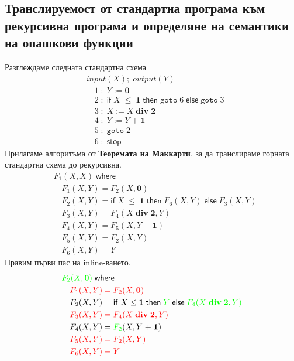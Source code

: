 \documentclass[14pt]{extarticle}
\begin{document}
\subsection*{Транслируемост от стандартна програма към рекурсивна програма и определяне на семантики на опашкови функции}
Разглеждаме следната стандартна схема
\begin{align*}
    & input(X); \; output(Y) \\
    & \quad 1 \; : \; Y := \mathbf 0 \\
    & \quad 2 \; : \; \mathsf{if} \; X \;\mathbf{\leq}\; \mathbf 1 \; \mathsf{then} \; \mathtt{goto} \; 6  \; \mathsf{else} \; \mathtt{goto} \; 3 \\
    & \quad 3 \; : \; X := X \;\mathbf{div}\; \mathbf 2 \\
    & \quad 4 \; : \; Y := Y \;\mathbf{+}\; \mathbf 1 \\
    & \quad 5 \; : \; \mathtt{goto} \; 2 \\
    & \quad 6 \; : \; \mathsf{stop}
\end{align*}
Прилагаме алгоритъма от \textbf{Теоремата на Маккарти}, за да транслираме горната стандартна схема до рекурсивна.
\begin{align*}
    & F_1(X, X) \; \mathsf{where} \\
    & \quad  F_1(X, Y) = F_2(X, \mathbf 0) \\
    & \quad F_2(X, Y) = \mathsf{if} \; X \;\mathbf{\leq}\; \mathbf 1 \; \mathsf{then} \; F_6(X, Y)  \; \mathsf{else} \; F_3(X, Y) \\
    & \quad F_3(X, Y) = F_4(X \;\mathbf{div}\; \mathbf 2, Y) \\
    & \quad F_4(X, Y) = F_5(X, Y \;\mathbf{+}\; \mathbf 1) \\
    & \quad F_5(X, Y) = F_2(X, Y) \\
    & \quad F_6(X, Y) = Y
\end{align*}
Правим първи пас на inline-ването.
\begin{align*}
    & \textcolor{green}{F_2(X, \mathbf 0)} \; \mathsf{where} \\
    & \color{red} \quad  F_1(X, Y) = F_2(X, \mathbf 0) \\
    & \quad F_2(X, Y) = \mathsf{if} \; X \;\mathbf{\leq}\; \mathbf 1 \; \mathsf{then} \; \textcolor{green}{Y}  \; \mathsf{else} \; \textcolor{green}{F_4(X \;\mathbf{div}\; \mathbf 2, Y)} \\
    & \color{red} \quad F_3(X, Y) = F_4(X \;\mathbf{div}\; \mathbf 2, Y) \\
    & \quad F_4(X, Y) = \textcolor{green}{F_2}(X, Y \;\mathbf{+}\; \mathbf 1) \\
    & \color{red} \quad F_5(X, Y) = F_2(X, Y) \\
    & \color{red} \quad F_6(X, Y) = Y
\end{align*}
\end{document}
